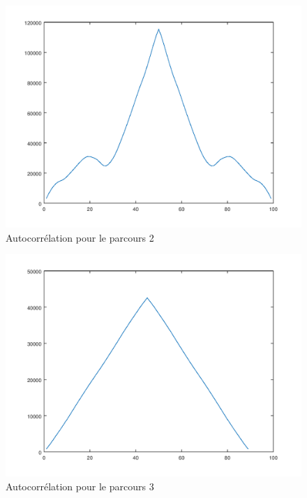 \documentclass{report}
\begin{document}
\begin{figure}[H]
	\begin{center}
		\includegraphics[scale=0.5]{Enregistrements/autocorrelation2.png}
	\end{center}
	\caption{Autocorrélation pour le parcours 2}
\end{figure}

\begin{figure}[H]
	\begin{center}
		\includegraphics[scale=0.5]{Enregistrements/autocorrelation3.png}
	\end{center}
	\caption{Autocorrélation pour le parcours 3}
\end{figure}
\end{document}
